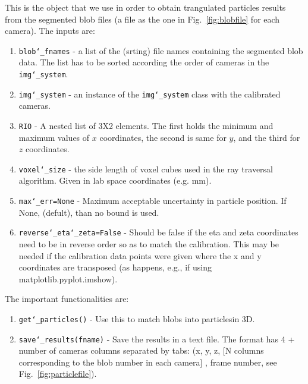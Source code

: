 \documentclass[10pt,a4paper]{article}
\begin{document}
This is the object that we use in order to obtain trangulated particles results from the segmented blob files (a file as the one in Fig.~\ref{fig:blobfile} for each camera). The inputs are:
%
\begin{enumerate}
	\item \texttt{blob\char`_fnames} - a list of the (srting) file names containing the segmented blob data. The list has to be sorted according the order of cameras in the \texttt{img\char`_system}.
	\item \texttt{img\char`_system} - an instance of the \texttt{img\char`_system} class with the calibrated cameras.
	\item \texttt{RIO} - A nested list of 3X2 elements. The first holds the minimum and  maximum values of $x$ coordinates, the second is same for $y$, and  the third for $z$ coordinates. 
	\item \texttt{voxel\char`_size} - the side length of voxel cubes used in the ray traversal algorithm. Given in lab space coordinates (e.g. mm).
	\item \texttt{max\char`_err=None} - Maximum acceptable uncertainty in particle position. If None, (defult), than no bound is used.
	\item \texttt{reverse\char`_eta\char`_zeta=False} - Should be false if the eta and zeta coordinates need to be in reverse order so as to match the calibration. This may be needed if the calibration data points were given where the x and y coordinates are transposed (as happens, e.g., if using matplotlib.pyplot.imshow).
\end{enumerate}


The important functionalities are:
%
\begin{enumerate}
	\item \texttt{get\char`_particles()} - Use this to match blobs into particlesin 3D.
	\item \texttt{save\char`_results(fname)} - Save the results in a text file. The format has 4 + number of cameras columns separated by tabs:
	(x, y, z, [N columns corresponding to the blob number in each camera] , frame number, see Fig.~\ref{fig:particlefile}).
\end{enumerate}
\end{document}
